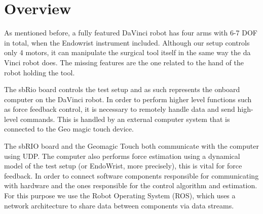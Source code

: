 \section{Overview}
As mentioned before, a fully featured DaVinci robot has four arms with 6-7 \gls{DOF} in total, when the Endowrist instrument included.
Although our setup controls only 4 motors, it can manipulate the surgical tool itself in the same way the da Vinci robot does. The missing features are the one related to the hand of the robot holding the tool.

The sbRio board controls the test setup and as such represents the onboard computer on the DaVinci robot.
In order to perform higher level functions such as force feedback control, it is necessary to remotely handle data and send high-level commands.
This is handled by an external computer system that is connected to the Geo magic touch device.

The sbRIO board and the Geomagic Touch both communicate with the computer using UDP.
The computer also performs force estimation using a dynamical model of the test setup (or EndoWrist, more precisely), this is vital for force feedback.
In order to connect software components responsible for communicating with hardware and the ones responsible for the control algorithm and estimation.
For this purpose we use the Robot Operating System (ROS), which uses a network architecture to share data between components via data streams.





